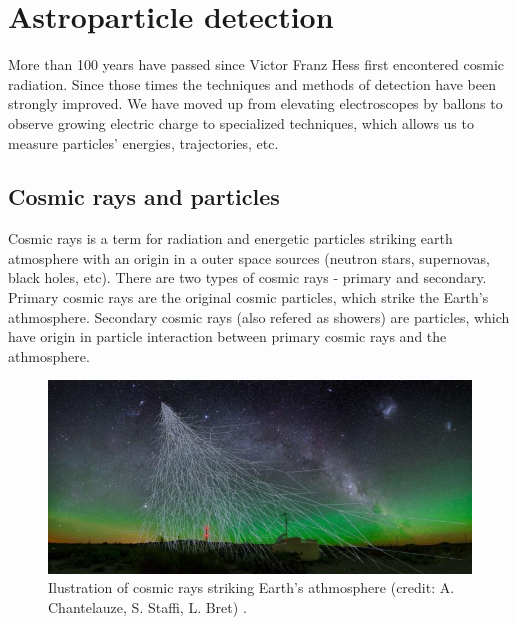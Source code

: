 
\chapter{Astroparticle detection}
More than 100 years have passed since Victor Franz Hess first encontered cosmic radiation. Since those times the techniques and methods of detection have been strongly improved. We have moved up from elevating electroscopes by ballons to observe growing electric charge to specialized techniques, which allows us to measure particles' energies, trajectories, etc.

\section{Cosmic rays and particles}
Cosmic rays is a term for radiation and energetic particles striking earth atmosphere with an origin in a outer space sources (neutron stars, supernovas, black holes, etc). There are two types of cosmic rays - primary and secondary. Primary cosmic rays are the original cosmic particles, which strike the Earth's athmosphere. Secondary cosmic rays (also refered as showers) are particles, which have origin in particle interaction between primary cosmic rays and the athmosphere.
\par
\begin{figure}[H]
 \centering
 \includegraphics[scale = 0.6]{./pictures/rays}
 \caption{Ilustration of cosmic rays striking Earth's athmosphere (credit: A. Chantelauze, S. Staffi, L. Bret) \cite{intro}.}
 \label{cascade}
 
\end{figure}

